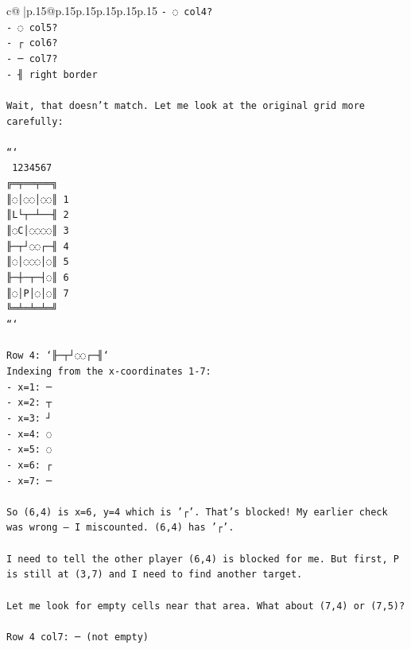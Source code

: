 \documentclass{article}
\begin{document}
{\begin{supertabular}{c@{$\;$}|p{.15\linewidth}@{}p{.15\linewidth}p{.15\linewidth}p{.15\linewidth}p{.15\linewidth}p{.15\linewidth}}
{{{\texttt{{-} ◌ col4?} \\
\texttt{{-} ◌ col5?} \\
\texttt{{-} ┌ col6?} \\
\texttt{{-} ─ col7?} \\
\texttt{{-} ╢ right border} \\
\\ 
\texttt{Wait, that doesn't match. Let me look at the original grid more carefully:} \\
\\ 
\texttt{```} \\
\texttt{ 1234567} \\
\texttt{╔═╤══╤══╗} \\
\texttt{║◌│◌◌│◌◌║ 1} \\
\texttt{║L└┬─┴──╢ 2} \\
\texttt{║◌C│◌◌◌◌║ 3} \\
\texttt{╟─┬┘◌◌┌─╢ 4} \\
\texttt{║◌│◌◌◌│◌║ 5} \\
\texttt{╟─┼─┬─┤◌║ 6} \\
\texttt{║◌│P│◌│◌║ 7} \\
\texttt{╚═╧═╧═╧═╝} \\
\texttt{```} \\
\\ 
\texttt{Row 4: `╟─┬┘◌◌┌─╢`} \\
\texttt{Indexing from the x{-}coordinates 1{-}7:} \\
\texttt{{-} x=1: ─} \\
\texttt{{-} x=2: ┬} \\
\texttt{{-} x=3: ┘} \\
\texttt{{-} x=4: ◌} \\
\texttt{{-} x=5: ◌} \\
\texttt{{-} x=6: ┌} \\
\texttt{{-} x=7: ─} \\
\\ 
\texttt{So (6,4) is x=6, y=4 which is '┌'. That's blocked! My earlier check was wrong — I miscounted. (6,4) has '┌'.} \\
\\ 
\texttt{I need to tell the other player (6,4) is blocked for me. But first, P is still at (3,7) and I need to find another target.} \\
\\ 
\texttt{Let me look for empty cells near that area. What about (7,4) or (7,5)?} \\
\\ 
\texttt{Row 4 col7: ─ (not empty)} \\
}}}
\end{supertabular}}
\end{document}
